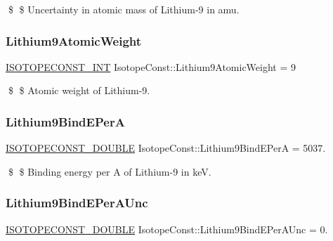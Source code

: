 \$ \$ Uncertainty in atomic mass of Lithium-\/9 in amu. \mbox{\label{group___isotope_const-_lithium-_li9_ga89109d7898b6d7b773a39c4c29f3e1e5}} 
\subsubsection{\texorpdfstring{Lithium9\+Atomic\+Weight}{Lithium9AtomicWeight}}
{\footnotesize\ttfamily \mbox{\hyperlink{group___isotope_const-_macros_ga5f18360b3e99483a35c32d789e62621c}{I\+S\+O\+T\+O\+P\+E\+C\+O\+N\+S\+T\+\_\+\+I\+NT}} Isotope\+Const\+::\+Lithium9\+Atomic\+Weight = 9}

\$ \$ Atomic weight of Lithium-\/9. \mbox{\label{group___isotope_const-_lithium-_li9_gad1dab9add08514c2e964d9d18b10abaa}} 
\subsubsection{\texorpdfstring{Lithium9\+Bind\+E\+PerA}{Lithium9BindEPerA}}
{\footnotesize\ttfamily \mbox{\hyperlink{group___isotope_const-_macros_ga8f45a7272ce02c0b4c65c44636ed719a}{I\+S\+O\+T\+O\+P\+E\+C\+O\+N\+S\+T\+\_\+\+D\+O\+U\+B\+LE}} Isotope\+Const\+::\+Lithium9\+Bind\+E\+PerA = 5037.}

\$ \$ Binding energy per A of Lithium-\/9 in keV. \mbox{\label{group___isotope_const-_lithium-_li9_gaf2a11264eff3e23c61b686b8a6280003}} 
\subsubsection{\texorpdfstring{Lithium9\+Bind\+E\+Per\+A\+Unc}{Lithium9BindEPerAUnc}}
{\footnotesize\ttfamily \mbox{\hyperlink{group___isotope_const-_macros_ga8f45a7272ce02c0b4c65c44636ed719a}{I\+S\+O\+T\+O\+P\+E\+C\+O\+N\+S\+T\+\_\+\+D\+O\+U\+B\+LE}} Isotope\+Const\+::\+Lithium9\+Bind\+E\+Per\+A\+Unc = 0.}


